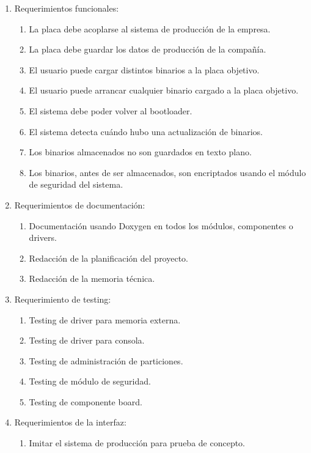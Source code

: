 \documentclass[
11pt, %
]{charter}
\begin{document}
\begin{enumerate}
	\item Requerimientos funcionales:
		\begin{enumerate}
			
			\item La placa debe acoplarse al sistema de producción de la empresa.
			\item La placa debe guardar los datos de producción de la compañía.
			\item El usuario puede cargar distintos binarios a la placa objetivo.
			\item El usuario puede arrancar cualquier binario cargado a la placa objetivo.
			\item El sistema debe poder volver al bootloader.
			\item El sistema detecta cuándo hubo una actualización de binarios.
			\item Los binarios almacenados no son guardados en texto plano.
			\item Los binarios, antes de ser almacenados, son encriptados usando el módulo de seguridad del sistema.
		\end{enumerate}
	\item Requerimientos de documentación:
		\begin{enumerate}
			\item Documentación usando Doxygen en todos los módulos, componentes o drivers.
			\item Redacción de la planificación del proyecto.
			\item Redacción de la memoria técnica.
		\end{enumerate}
	\item Requerimiento de testing:
		\begin{enumerate}
			\item Testing de driver para memoria externa.
			\item Testing de driver para consola.
			\item Testing de administración de particiones.
			\item Testing de módulo de seguridad.
			\item Testing de componente board.
		\end{enumerate}
	\item Requerimientos de la interfaz:
		\begin{enumerate}
			\item Imitar el sistema de producción para prueba de concepto.
		\end{enumerate}
\end{enumerate}
\end{document}
